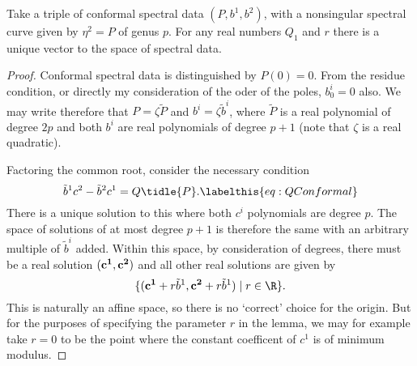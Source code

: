 
















\begin{lem}
Take a triple of conformal spectral data $(P,b^1,b^2)$, with a nonsingular spectral curve given by $η^2 = P$ of genus $p$. For any real numbers $Q_1$ and $r$ there is a unique vector to the space of spectral data.

\begin{proof}
Conformal spectral data is distinguished by $P(0)=0$. From the residue condition, or directly my consideration of the oder of the poles, $b^i_0 = 0$ also. We may write therefore that $P= ζ\tilde{P}$ and $b^i = ζ \tilde{b}^i$, where $\tilde{P}$ is a real polynomial of degree $2p$ and both $b^i$ are real polynomials of degree $p+1$ (note that $ζ$ is a real quadratic).

Factoring the common root, consider the necessary condition
\[
\tilde{b}^1 c^2 - \tilde{b}^2 c^1 = Q\tidle{P}.\labelthis{eq:QConformal}
\]
There is a unique solution to this where both $c^i$ polynomials are degree $p$. The space of solutions of at most degree $p+1$ is therefore the same with an arbitrary multiple of $\tilde{b}^i$ added. Within this space, by consideration of degrees, there must be a real solution $(\bf c^1, \bf c^2)$ and all other real solutions are given by
\[
\{ ({\bf c^1} + r \tilde{b}^1, {\bf c^2} + r \tilde{b}^1) \mid r\in \R\}.
\]
This is naturally an affine space, so there is no `correct' choice for the origin. But for the purposes of specifying the parameter $r$ in the lemma, we may for example take $r=0$ to be the point where the constant coefficent of $c^1$ is of minimum modulus.


\end{proof}
\end{lem}
